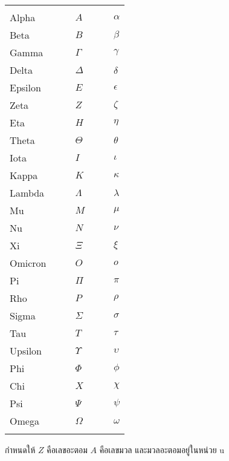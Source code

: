 \begin{tabular}[!ht]{lclcl}
\hline\\
Alpha&$\quad$&$A$&$\quad$&$\alpha$\\
Beta&&$B$&&$\beta$\\
Gamma&&$\Gamma$&&$\gamma$\\
Delta&&$\Delta$&&$\delta$\\
Epsilon&&$E$&&$\epsilon$\\
Zeta&&$Z$&&$\zeta$\\
Eta&&$H$&&$\eta$\\
Theta&&$\Theta$&&$\theta$\\
Iota&&$I$&&$\iota$\\
Kappa&&$K$&&$\kappa$\\
Lambda&&$\Lambda$&&$\lambda$\\
Mu&&$M$&&$\mu$\\
Nu&&$N$&&$\nu$\\
Xi&&$\Xi$&&$\xi$\\
Omicron&&$O$&&$o$\\
Pi&&$\Pi$&&$\pi$\\
Rho&&$P$&&$\rho$\\
Sigma&&$\Sigma$&&$\sigma$\\
Tau&&$T$&&$\tau$\\
Upsilon&&$\Upsilon$&&$\upsilon$\\
Phi&&$\Phi$&&$\phi$\\
Chi&&$X$&&$\chi$\\
Psi&&$\Psi$&&$\psi$\\
Omega&&$\Omega$&&$\omega$\\\\
\hline
\end{tabular}


\newpage
\renewcommand{\thesection}{ค}
\renewcommand{\theequation}{\thesection.\arabic{equation}}
 \setcounter{equation}{0}
\label{SecApp3}
\noindent กำหนดให้ $Z$ คือเลขอะตอม $A$ คือเลขมวล และมวลอะตอมอยู่ในหน่วย u\\

